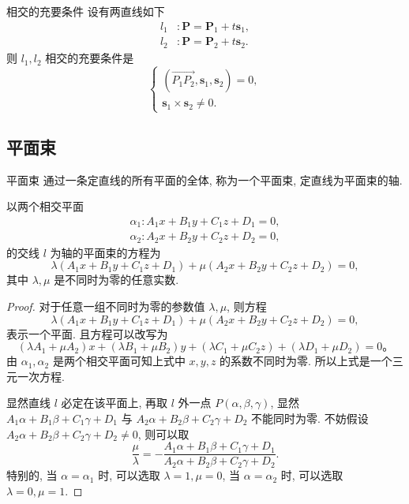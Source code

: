 \documentclass[cn,toc=twocol]{elegantbook}
\newcommand{\ve}[1]{\boldsymbol{#1}}
\newcommand{\Ve}[1]{\overrightarrow{#1}}
\begin{document}
\begin{corollary}{相交的充要条件}
	设有两直线如下
	\[
	\begin{aligned}
		l_1 &: \ve P = \ve P_1 + t \ve s_1,\\
		l_2 &: \ve P = \ve P_2 + t \ve s_2.
	\end{aligned}
	\]
	则 $l_1, l_2$ 相交的充要条件是
	\[
		\begin{cases}
			(\Ve{P_1P_2}, \ve s_1, \ve s_2) = 0,\\
			\ve s_1 \times \ve s_2 \neq 0.
		\end{cases}
	\]
\end{corollary}

\subsection{平面束}

\begin{definition}{平面束}
	通过一条定直线的所有平面的全体, 称为一个平面束, 定直线为平面束的轴.
\end{definition}

\begin{theorem}
	以两个相交平面
	\[
	\begin{aligned}
		\alpha_1 : A_1 x + B_1 y + C_1 z + D_1 =0,\\
		\alpha_2 : A_2 x + B_2 y + C_2 z + D_2 =0,
	\end{aligned}
	\]
	的交线 $l$ 为轴的平面束的方程为
	\[
		\lambda(A_1 x + B_1 y + C_1 z + D_1) + \mu(A_2 x + B_2 y + C_2 z + D_2) = 0,
	\]
	其中 $\lambda,\mu$ 是不同时为零的任意实数.
\end{theorem}
\begin{proof}
	对于任意一组不同时为零的参数值 $\lambda, \mu$, 则方程
	\[
		\lambda(A_1 x + B_1 y + C_1 z + D_1) + \mu(A_2 x + B_2 y + C_2 z + D_2) = 0,
	\] 
	表示一个平面. 且方程可以改写为
	\[
		(\lambda A_1 + \mu A_2) x + (\lambda B_1 + \mu B_2) y + (\lambda C_1 + \mu C_2 z) + (\lambda D_1 + \mu D_2) = 0。
	\]
	由 $\alpha_1, \alpha_2$ 是两个相交平面可知上式中 $x,y,z$ 的系数不同时为零. 所以上式是一个三元一次方程.
	
	显然直线 $l$ 必定在该平面上, 再取 $l$ 外一点 $P (\alpha, \beta, \gamma)$, 显然 $A_1 \alpha + B_1 \beta + C_1 \gamma + D_1$ 与 $A_2 \alpha + B_2 \beta + C_2 \gamma + D_2$ 
	不能同时为零. 不妨假设 $A_2 \alpha + B_2 \beta + C_2 \gamma + D_2 \neq 0$, 则可以取
	\[
		\frac{\mu}{\lambda} = - \frac{A_1 \alpha + B_1 \beta + C_1 \gamma + D_1}{A_2 \alpha + B_2 \beta + C_2 \gamma + D_2}.
	\]
	特别的, 当 $\alpha = \alpha_1$ 时, 可以选取 $\lambda = 1, \mu = 0$, 当 $\alpha = \alpha_2$ 时, 可以选取 $\lambda = 0, \mu = 1$.
\end{proof}
\end{document}
